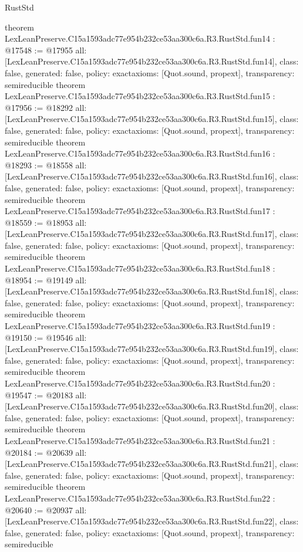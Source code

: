 \begin{lexlean}{RustStd}
\begin{coremodule}
{}
theorem LexLeanPreserve.C15a1593adc77e954b232ce53aa300c6a.R3.RustStd.fun14 : @17548 := @17955 {
  all: [LexLeanPreserve.C15a1593adc77e954b232ce53aa300c6a.R3.RustStd.fun14],
  class: false,
  generated: false,
  policy: exact{axioms: [Quot.sound, propext]},
  transparency: semireducible
}
theorem LexLeanPreserve.C15a1593adc77e954b232ce53aa300c6a.R3.RustStd.fun15 : @17956 := @18292 {
  all: [LexLeanPreserve.C15a1593adc77e954b232ce53aa300c6a.R3.RustStd.fun15],
  class: false,
  generated: false,
  policy: exact{axioms: [Quot.sound, propext]},
  transparency: semireducible
}
theorem LexLeanPreserve.C15a1593adc77e954b232ce53aa300c6a.R3.RustStd.fun16 : @18293 := @18558 {
  all: [LexLeanPreserve.C15a1593adc77e954b232ce53aa300c6a.R3.RustStd.fun16],
  class: false,
  generated: false,
  policy: exact{axioms: [Quot.sound, propext]},
  transparency: semireducible
}
theorem LexLeanPreserve.C15a1593adc77e954b232ce53aa300c6a.R3.RustStd.fun17 : @18559 := @18953 {
  all: [LexLeanPreserve.C15a1593adc77e954b232ce53aa300c6a.R3.RustStd.fun17],
  class: false,
  generated: false,
  policy: exact{axioms: [Quot.sound, propext]},
  transparency: semireducible
}
theorem LexLeanPreserve.C15a1593adc77e954b232ce53aa300c6a.R3.RustStd.fun18 : @18954 := @19149 {
  all: [LexLeanPreserve.C15a1593adc77e954b232ce53aa300c6a.R3.RustStd.fun18],
  class: false,
  generated: false,
  policy: exact{axioms: [Quot.sound, propext]},
  transparency: semireducible
}
theorem LexLeanPreserve.C15a1593adc77e954b232ce53aa300c6a.R3.RustStd.fun19 : @19150 := @19546 {
  all: [LexLeanPreserve.C15a1593adc77e954b232ce53aa300c6a.R3.RustStd.fun19],
  class: false,
  generated: false,
  policy: exact{axioms: [Quot.sound, propext]},
  transparency: semireducible
}
theorem LexLeanPreserve.C15a1593adc77e954b232ce53aa300c6a.R3.RustStd.fun20 : @19547 := @20183 {
  all: [LexLeanPreserve.C15a1593adc77e954b232ce53aa300c6a.R3.RustStd.fun20],
  class: false,
  generated: false,
  policy: exact{axioms: [Quot.sound, propext]},
  transparency: semireducible
}
theorem LexLeanPreserve.C15a1593adc77e954b232ce53aa300c6a.R3.RustStd.fun21 : @20184 := @20639 {
  all: [LexLeanPreserve.C15a1593adc77e954b232ce53aa300c6a.R3.RustStd.fun21],
  class: false,
  generated: false,
  policy: exact{axioms: [Quot.sound, propext]},
  transparency: semireducible
}
theorem LexLeanPreserve.C15a1593adc77e954b232ce53aa300c6a.R3.RustStd.fun22 : @20640 := @20937 {
  all: [LexLeanPreserve.C15a1593adc77e954b232ce53aa300c6a.R3.RustStd.fun22],
  class: false,
  generated: false,
  policy: exact{axioms: [Quot.sound, propext]},
  transparency: semireducible
}
\end{coremodule}
\end{lexlean}
